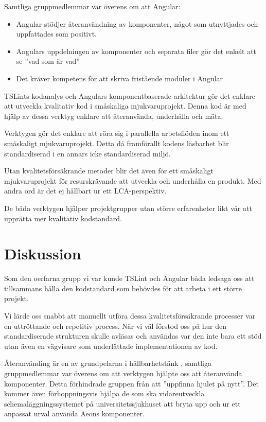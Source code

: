Samtliga gruppmedlemmar var överens om att Angular:

\begin{itemize}
	\item Angular stödjer återanvändning av komponenter, något som utnyttjades och uppfattades som positivt.
	\item Angulars uppdelningen av komponenter och separata filer gör det enkelt att se ''vad som är vad''
	\item Det kräver kompetens för att skriva fristående moduler i Angular
\end{itemize}

TSLints kodanalys och Angulars komponentbaserade arkitektur gör det enklare att utveckla kvalitativ kod i småskaliga mjukvaruprojekt. Denna kod är med hjälp av dessa verktyg enklare att återanvända, underhålla och mäta.

Verktygen gör det enklare att röra sig i parallella arbetsflöden inom ett småskaligt mjukvaruprojekt. Detta då framförallt kodens läsbarhet blir standardiserad i en annars icke standardiserad miljö.

Utan kvalitetsförsäkrande metoder blir det även för ett småskaligt mjukvaruprojekt för resurskrävande att utveckla och underhålla en produkt. Med andra ord är det ej hållbart ur ett LCA-perspektiv.

De båda verktygen hjälper projektgrupper utan större erfarenheter likt vår att upprätta mer kvalitativ kodstandard.

\section{Diskussion}

Som den oerfarna  grupp vi var kunde TSLint och Angular båda ledsaga oss att tillsammans hålla den kodstandard som behövdes för att arbeta i ett större projekt.

Vi lärde oss snabbt att manuellt utföra dessa kvalitetsförsäkrande processer var en uttröttande och repetitiv process. När vi väl förstod oss på hur den standardiserade strukturen skulle avläsas och användas var den inte bara ett stöd utan även en vägvisare som underlättade implementationen av kod.

Återanvänding är en av grundpelarna i hållbarhetstänk \cite{sustainable}, samtliga gruppmedlemmar var överens om att verktygen hjälpte oss att återanvända komponenter. Detta förhindrade gruppen från att ''uppfinna hjulet på nytt''. Det kommer även förhoppningsvis hjälpa de som ska vidareutveckla schemaläggningssystemet på universitetssjukhuset att bryta upp och ur ett anpassat urval använda Aeons komponenter.

